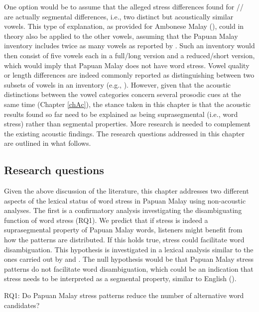 One option would be to assume that the alleged stress differences found for // are actually segmental differences, i.e., two distinct but acoustically similar vowels. This type of explanation, as provided for Ambonese Malay (\citealt{maskikit-essed_no_2016}), could in theory also be applied to the other vowels, assuming that the Papuan Malay inventory includes twice as many vowels as reported by \citet{kluge_grammar_2017}. Such an inventory would then consist of five vowels each in a full/long version and a reduced/short version, which would imply that Papuan Malay does not have word stress. Vowel quality or length differences are indeed commonly reported as distinguishing between two subsets of vowels in an inventory (e.g., \citealt{maddieson_patterns_2009}). However, given that the acoustic distinctions between the vowel categories concern several prosodic cues at the same time (Chapter \ref{chAc}), the stance taken in this chapter is that the acoustic results found so far need to be explained as being suprasegmental (i.e., word stress) rather than segmental properties. More research is needed to complement the existing acoustic findings. The research questions addressed in this chapter are outlined in what follows.

\subsection{Research questions} 
Given the above discussion of the literature, this chapter addresses two different aspects of the lexical status of word stress in Papuan Malay using non-acoustic analyses. The first is a confirmatory analysis investigating the disambiguating function of word stress (RQ1). We predict that if stress is indeed a suprasegmental property of Papuan Malay words, listeners might benefit from how the patterns are distributed. If this holds true, stress could facilitate word disambiguation. This hypothesis is investigated in a lexical analysis similar to the ones carried out by \citet{cutler_phonemic_2004} and \citet{cutler_explaining_2006}. The null hypothesis would be that Papuan Malay stress patterns do not facilitate word disambiguation, which could be an indication that stress needs to be interpreted as a segmental property, similar to English (\citealt{cooper_constraints_2002}).\\ \par

\noindent RQ1: Do Papuan Malay stress patterns reduce the number of alternative word candidates?\\

